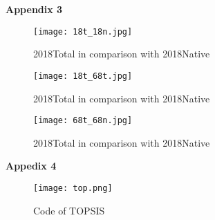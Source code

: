 \documentclass[12pt]{article}  %
\begin{document}
\large\textbf{Appendix 3}
\begin{figure}[H]
	\centering
	\texttt{[image: 18t\_18n.jpg]}
	\caption{2018Total in comparison with 2018Native}\label{fig:18t_18n}
\end{figure}
\begin{figure}[H]
	\centering
	\texttt{[image: 18t\_68t.jpg]}
	\caption{2018Total in comparison with 2018Native}\label{fig:18t_68t}
\end{figure}
\begin{figure}[H]
	\centering
	\texttt{[image: 68t\_68n.jpg]}
	\caption{2018Total in comparison with 2018Native}\label{fig:68t_68n}
\end{figure}
\large\textbf{Appedix 4}
\begin{figure}[H]
	\centering
	\texttt{[image: top.png]}
	\caption{Code of TOPSIS}\label{fig:top}
\end{figure}
\end{document}
